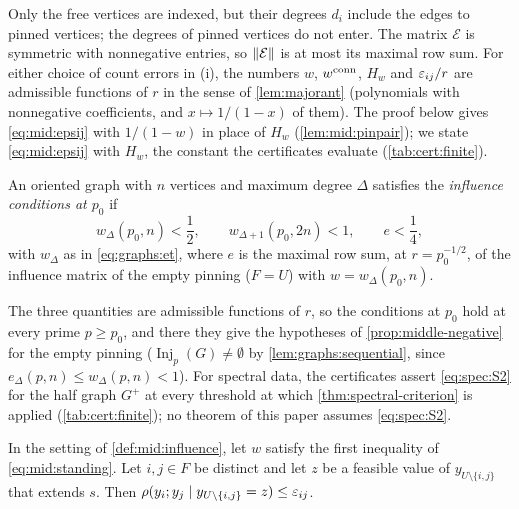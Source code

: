 Only the free vertices are indexed, but their degrees $d_i$ include the edges
to pinned vertices; the degrees of pinned vertices do not enter. The matrix
$\mathcal E$ is symmetric with nonnegative entries, so $\left\|\mathcal E\right\|$ is at
most its maximal row sum. For either choice of count errors in (i), the
numbers $w$, $w^{\rm conn}$, $H_w$ and $\varepsilon_{ij}/r$ are admissible functions of
$r$ in the sense of \cref{lem:majorant} (polynomials with nonnegative
coefficients, and $x\mapsto1/(1-x)$ of them). The proof below gives
\eqref{eq:mid:epsij} with $1/(1-w)$ in place of $H_w$
(\cref{lem:mid:pinpair}); we state \eqref{eq:mid:epsij} with $H_w$, the constant the certificates evaluate (\cref{tab:cert:finite}).

\begin{definition}
An oriented graph with $n$ vertices and maximum degree $\Delta$ satisfies the
\emph{influence conditions at $p_0$} if
\begin{equation}\label{eq:spec:S2}
  w_\Delta(p_0,n)<\frac12,\qquad w_{\Delta+1}(p_0,2n)<1,\qquad e<\frac14,
\end{equation}
with $w_\Delta$ as in \eqref{eq:graphs:et}, where $e$ is the maximal row sum,
at $r=p_0^{-1/2}$, of the influence matrix of the empty pinning ($F=U$) with
$w=w_\Delta(p_0,n)$.
\end{definition}

The three quantities are admissible functions of $r$, so the conditions at
$p_0$ hold at every prime $p\ge p_0$, and there they give the hypotheses of
\cref{prop:middle-negative} for the empty pinning ($\operatorname{Inj}_p(G)\ne
\emptyset$ by \cref{lem:graphs:sequential}, since $e_\Delta(p,n)\le
w_\Delta(p,n)<1$). For spectral data, the certificates assert
\eqref{eq:spec:S2} for the half graph $G^+$ at every threshold at which
\cref{thm:spectral-criterion} is applied (\cref{tab:cert:finite}); no theorem of this paper assumes \eqref{eq:spec:S2}.

\begin{lemma}\label{lem:mid:pinpair}
In the setting of \cref{def:mid:influence}, let $w$ satisfy the first
inequality of \eqref{eq:mid:standing}. Let $i,j\in F$ be distinct and let $z$ be
a feasible value of $y_{U\setminus\{i,j\}}$ that extends $s$. Then
$\rho(y_i;y_j\mid y_{U\setminus\{i,j\}}=z)\le\varepsilon_{ij}$.
\end{lemma}

